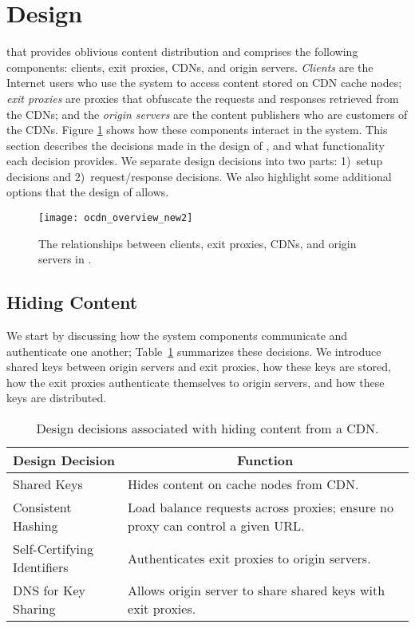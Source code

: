\section{Design}
\label{sec:design}

\system{} that provides oblivious content distribution and  
comprises the following components: clients, exit proxies, CDNs, and origin 
servers.  {\em Clients} are the Internet users who use the system to access content
stored on CDN cache nodes; {\em exit proxies} are proxies that obfuscate the requests
and responses retrieved from the CDNs; and the {\em origin servers} are the content
publishers who are customers of the CDNs.  Figure \ref{fig:ocd_overview} shows how
these components interact in the system.  This section describes the decisions 
made in the design of \system{}, and what functionality each decision provides.  
We separate design decisions into two parts: 1)~setup decisions and 2)~request/response decisions.  We also highlight some additional options that the design of 
\system{} allows.

\begin{figure}[t!]
\centering
\texttt{[image: ocdn\_overview\_new2]}
\caption{The relationships between clients, exit proxies, CDNs, and origin servers in 
\system{}.}
\label{fig:ocd_overview}
\end{figure}

\subsection{Hiding Content}
\label{sec:hiding_content}
We start by discussing how the system components communicate and authenticate 
one another; Table~\ref{tab:setup} summarizes these decisions. 
We introduce shared keys between origin servers and exit proxies, how these keys
are 
stored, how the exit proxies authenticate themselves to origin servers, and how these 
keys are distributed.

\begin{table}[t!]
\footnotesize
\centering
\begin{tabular}{ p{1.15in}  p{1.8in} } 
 \multicolumn{1}{c}{\bf Design Decision} & \multicolumn{1}{c}{\bf Function} \\
\hline \hline
 Shared Keys & {Hides content on cache nodes from CDN.} \\
 Consistent Hashing & {Load balance requests across proxies; ensure no proxy can
 control a given URL.} \\
 Self-Certifying Identifiers & {Authenticates exit proxies to origin servers.} \\
 DNS for Key Sharing & {Allows origin server to share shared keys with exit
 proxies.} \\ \hline
\end{tabular}
\caption{Design decisions associated with hiding content from a CDN.}
\label{tab:setup}
\end{table}

